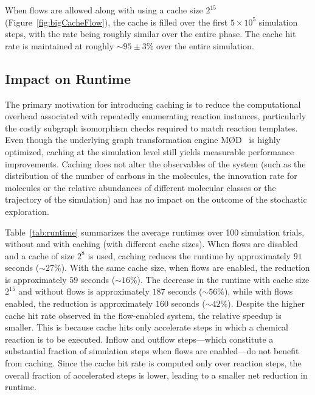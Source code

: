 When flows are allowed along with using a cache size $2^{15}$ (Figure~\ref{fig:bigCacheFlow}), the cache is filled over the first $5\times 10^5$ simulation steps, with the rate being roughly similar over the entire phase. The cache hit rate is maintained at roughly $\sim 95\pm 3 \%$ over the entire simulation.

\subsection{Impact on Runtime}

The primary motivation for introducing caching is to reduce the computational overhead associated with repeatedly enumerating reaction instances, particularly the costly subgraph isomorphism checks required to match reaction templates. Even though the underlying graph transformation engine MØD~\cite{mod_graphTransformation} is highly optimized, caching at the simulation level still yields measurable performance improvements. Caching does not alter the observables of the system (such as the distribution of the number of carbons in the molecules, the innovation rate for molecules or the relative abundances of different molecular classes or the trajectory of the simulation) and has no impact on the outcome of the stochastic exploration.

Table~\ref{tab:runtime} summarizes the average runtimes over 100 simulation trials, without and with caching (with different cache sizes). When flows are disabled and a cache of size $2^8$ is used, caching reduces the runtime by approximately $91$ seconds ($\sim 27\%$). With the same cache size, when flows are enabled, the reduction is approximately $59$ seconds ($\sim 16\%$).
The decrease in the runtime with cache size $2^{15}$ and without flows is approximately $187$ seconds ($\sim 56\%$), while with flows enabled, the reduction is approximately $160$ seconds ($\sim 42\%$).
Despite the higher cache hit rate observed in the flow-enabled system, the relative speedup is smaller. This is because cache hits only accelerate steps in which a chemical reaction is to be executed. Inflow and outflow steps—which constitute a substantial fraction of simulation steps when flows are enabled—do not benefit from caching. Since the cache hit rate is computed only over reaction steps, the overall fraction of accelerated steps is lower, leading to a smaller net reduction in runtime.

